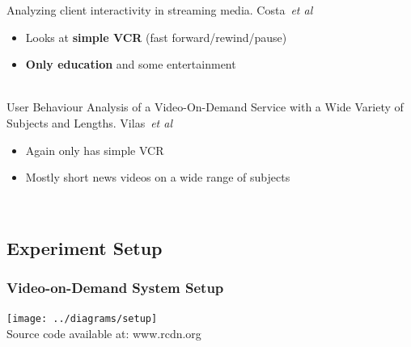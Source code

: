 \documentclass[xcolor=pdftex,dvipsnames,table]{beamer}
\begin{document}
\begin{frame}
{        %
        Analyzing client interactivity in streaming media. Costa~{\it et al}
        \begin{itemize}
            \item Looks at \textbf{simple VCR} (fast forward/rewind/pause)
            \item \textbf{Only education} and some entertainment
        \end{itemize}~\\

        User Behaviour Analysis of a Video-On-Demand Service with a Wide Variety of Subjects and Lengths. Vilas~{\it et al}
        \begin{itemize}
            \item Again only has simple VCR
            \item Mostly short news videos on a wide range of subjects
        \end{itemize}~\\

    }

\end{frame}

\subsection{Experiment Setup}

\begin{frame}
    \frametitle{Video-on-Demand System Setup}

    \begin{center}
        \texttt{[image: ../diagrams/setup]}
        \\Source code available at: www.rcdn.org
    \end{center}

\end{frame}
\end{document}
